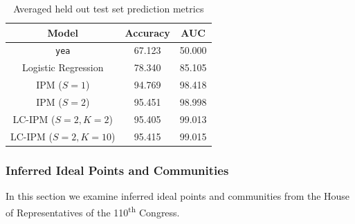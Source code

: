 \documentclass{article}
\begin{document}
\vspace{2ex}
\begin{table}[h]
\begin{center}
\begin{tabular}{c | c |c}
Model &  Accuracy & AUC\\ %
\hline
\hline
\texttt{yea} & 67.123 & 50.000\\
Logistic Regression & 78.340 & 85.105\\
\hline
IPM ($S= 1$)  &  94.769 & 98.418\\
IPM ($S= 2$)  & 95.451 & 98.998\\
\hline
LC-IPM ($S=2, K=2$)  & 95.405 & 99.013\\
LC-IPM ($S=2, K=10$)  & 95.415 & 99.015
\end{tabular}
\end{center}
\caption{Averaged held out test set prediction metrics}
\label{table:results_table}
\end{table} 

\subsubsection{Inferred Ideal Points and Communities}
In this section we examine inferred ideal points and communities from the House of Representatives of the 110\textsuperscript{th} Congress.
\end{document}
